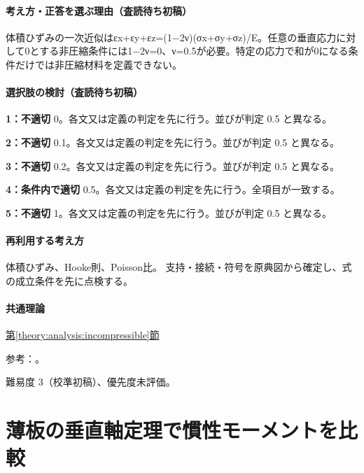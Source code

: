 \paragraph{考え方・正答を選ぶ理由（査読待ち初稿）} 体積ひずみの一次近似はεx+εy+εz=\allowbreak{}(1−2ν)(σx+σy+σz)/E。任意の垂直応力に対して0とする非圧縮条件には1−2ν=0、ν=0.5が必要。特定の応力で和が0になる条件だけでは非圧縮材料を定義できない。

\paragraph{選択肢の検討（査読待ち初稿）}\mbox{}\par

\noindent\textbf{1：不適切} 0。各文又は定義の判定を先に行う。並びが判定 0.5 と異なる。\par

\noindent\textbf{2：不適切} 0.1。各文又は定義の判定を先に行う。並びが判定 0.5 と異なる。\par

\noindent\textbf{3：不適切} 0.2。各文又は定義の判定を先に行う。並びが判定 0.5 と異なる。\par

\noindent\textbf{4：条件内で適切} 0.5。各文又は定義の判定を先に行う。全項目が一致する。\par

\noindent\textbf{5：不適切} 1。各文又は定義の判定を先に行う。並びが判定 0.5 と異なる。\par

\paragraph{再利用する考え方} 体積ひずみ、Hooke則、Poisson比。 支持・接続・符号を原典図から確定し、式の成立条件を先に点検する。

\paragraph{共通理論} \hyperref[theory:analysis:incompressible]{第\ref*{theory:analysis:incompressible}節}

\par 参考：\cite{mit_material_elastic2000}。

\par 難易度 3（校準初稿）、優先度未評価。

\section{薄板の垂直軸定理で慣性モーメントを比較}

